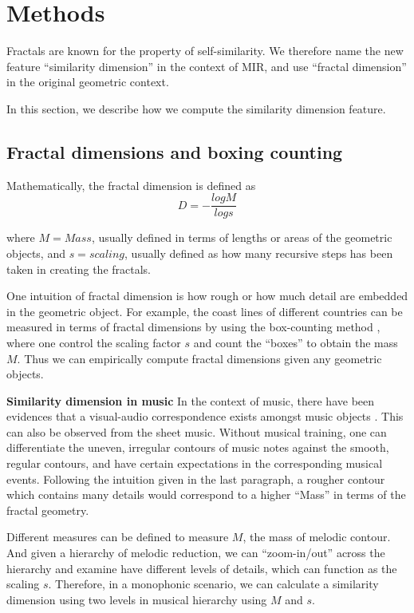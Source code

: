 \section{Methods}
Fractals are known for the property of self-similarity.
We therefore name the new feature ``similarity dimension'' in the context of MIR, and use ``fractal dimension'' in the original geometric context.

In this section, we describe how we compute the similarity dimension feature.

\subsection{Fractal dimensions and boxing counting}
Mathematically, the fractal dimension is defined as $$D=-\frac{logM}{logs}$$

where $M=Mass$, usually defined in terms of lengths or areas of the geometric objects, and $s=scaling$, usually defined as how many recursive steps has been taken in creating the fractals.

One intuition of fractal dimension is how rough or how much detail are embedded in the geometric object.
For example, the coast lines of different countries can be measured in terms of fractal dimensions by using the box-counting method \cite{sarkar1994efficient}, where one control the scaling factor $s$ and count the ``boxes'' to obtain the mass $M$.
Thus we can empirically compute fractal dimensions given any geometric objects. 

\textbf{Similarity dimension in music}
In the context of music, there have been evidences that a visual-audio correspondence exists amongst music objects \cite{thorpe2016perception}.
This can also be observed from the sheet music.
Without musical training, one can differentiate the uneven, irregular contours of music notes against the smooth, regular contours, and have certain expectations in the corresponding musical events.
Following the intuition given in the last paragraph, a rougher contour which contains many details would correspond to a higher ``Mass'' in terms of the fractal geometry.

Different measures can be defined to measure $M$, the mass of melodic contour.
And given a hierarchy of melodic reduction, we can ``zoom-in/out'' across the hierarchy and examine have different levels of details, which can function as the scaling $s$.
Therefore, in a monophonic scenario, we can calculate a similarity dimension using two levels in musical hierarchy using $M$ and $s$. 

